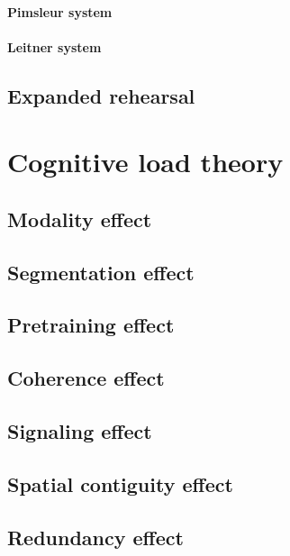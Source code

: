             \paragraph{Pimsleur system}

            \paragraph{Leitner system}

        \subsection{Expanded rehearsal}


    \section{Cognitive load theory}

        \subsection{Modality effect}

        \subsection{Segmentation effect}

        \subsection{Pretraining effect}

        \subsection{Coherence effect}

        \subsection{Signaling effect}

        \subsection{Spatial contiguity effect}

        \subsection{Redundancy effect}

